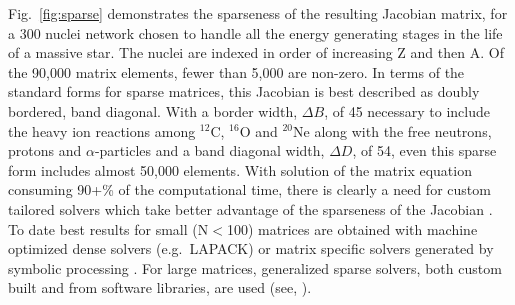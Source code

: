 \documentclass[12pt,modern,tighten,times,apj]{aastex61}
\newcommand{\eg}{e.g.}
\newcommand{\alp}{\ensuremath{\alpha}}
\newcommand{\isotope}[2]{\ensuremath{\mathrm{^{#2}#1}}}
\begin{document}
Fig.~\ref{fig:sparse} demonstrates the sparseness of the resulting Jacobian 
matrix, for a 300 nuclei network chosen to handle all the energy generating stages in the life of a massive star.  The nuclei are indexed in order of increasing Z and then A.  Of the 90,000 matrix elements, fewer than 5,000 are non-zero.  In terms of
the standard forms for sparse matrices, this Jacobian is best described
as doubly bordered, band diagonal.  With a border width, $\Delta B$, of
45 necessary to include the heavy ion reactions among \isotope{C}{12}, 
\isotope{O}{16} and \isotope{Ne}{20} along with the free neutrons, protons and
\alp -particles and a band diagonal width, $\Delta D$, of
54, even this sparse form includes almost 50,000 elements.  With solution
of the matrix equation consuming 90+\% of the computational time, there
is clearly a need for custom tailored solvers which take better advantage 
of the sparseness of the Jacobian \cite{PrAA87}. To date best results for small (N$<$100) matrices are obtained with machine optimized dense solvers (\eg\ LAPACK) or matrix specific solvers generated by symbolic processing \cite{Mull98,Mull86}.
For large matrices, generalized sparse solvers, both custom built and from
software libraries, are used (see, \cite{Timm99}).  



\end{document}
